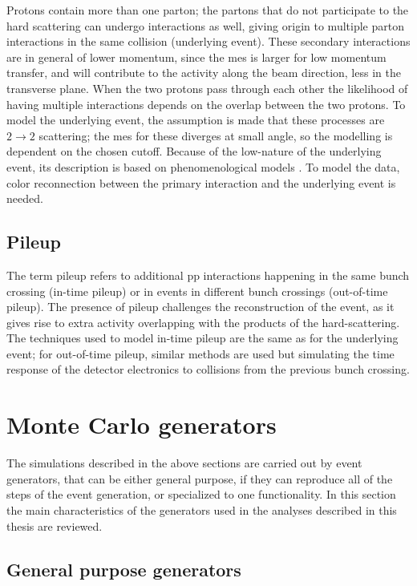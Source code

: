 Protons contain more than one parton; the partons that do not participate to the hard scattering can undergo interactions as well, giving origin to multiple parton interactions in the same collision (underlying event).
These secondary interactions are in general of lower momentum, since the \glspl{me} is larger for low momentum transfer, and will contribute to the activity along the beam direction, less in the transverse plane. 
When the two protons pass through each other the likelihood of having multiple interactions depends on the overlap between the two protons. 
To model the underlying event, the assumption is made that these processes are $2\rightarrow2$ scattering; the \glspl{me} for these diverges at small angle, so the modelling is dependent on the chosen \pt cutoff. 
Because of the low-\pt nature of the underlying event, its description is based on phenomenological models \cite{ATL-PHYS-PUB-2014-021,Skands:2010ak}.
To model the data, color reconnection between the primary interaction and the underlying event is needed. 

\subsection{Pileup}

The term pileup refers to additional \gls{pp} interactions happening in the same bunch crossing (in-time pileup) or in events in different bunch crossings (out-of-time pileup). 
The presence of pileup challenges the reconstruction of the event, as it gives rise to extra activity overlapping with the products of the hard-scattering. The techniques used to model in-time pileup are the same as for the underlying event; 
for out-of-time pileup, similar methods are used but simulating the time response of the detector electronics to collisions from the previous bunch crossing. 

\section{Monte Carlo generators}
\label{sec:mcgen}

The simulations described in the above sections are carried out by event generators, that can be either general purpose, 
if they can reproduce all of the steps of the event generation, or specialized to one functionality. 
In this section the main characteristics of the generators used in the analyses described in this thesis are reviewed.

\subsection{General purpose generators}

